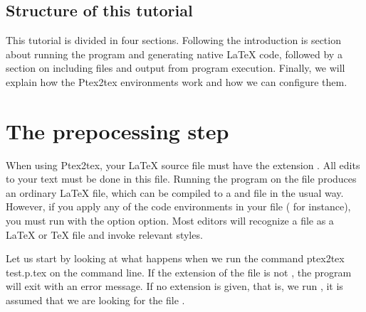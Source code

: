 \documentclass[a4paper,11pt]{article}
\begin{document}
\subsection{Structure of this tutorial}
This tutorial is divided in four sections. Following the introduction is
section about running the  program and generating
native \LaTeX{} code, followed by a section on including files
and output from program execution. Finally, we will explain how the
Ptex2tex environments work and how we can configure them.

\section{The prepocessing step}
When using Ptex2tex, your \LaTeX{} source file must have the extension
. All edits to your text must be done in this file.
Running the program  on the  file produces
an ordinary \LaTeX{} file, which can be compiled to a  and
 file in the usual way. However, if you apply any of
the  code environments in your 
file ( for instance), you must run
 with the option  option.
Most editors will recognize a  file as a \LaTeX{} or \TeX{}
file and invoke relevant styles.

Let us start by looking at what happens when we run the command
\bsys
ptex2tex test.p.tex
\esys
on the command line. If the extension of
the file is not , the program will exit with an error
message. If no extension is given, that is, we run , it
is assumed that we are looking for the file .
\end{document}
